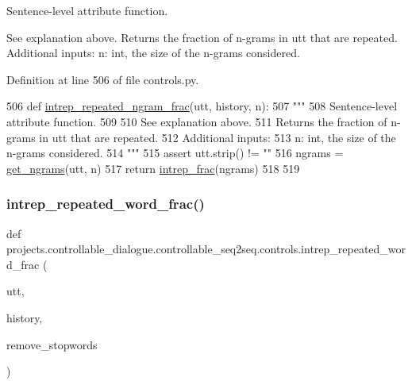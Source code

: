 \begin{DoxyVerb}Sentence-level attribute function.

See explanation above.
Returns the fraction of n-grams in utt that are repeated.
Additional inputs:
  n: int, the size of the n-grams considered.
\end{DoxyVerb}
 

Definition at line 506 of file controls.\+py.


\begin{DoxyCode}
506 \textcolor{keyword}{def }\hyperlink{namespaceprojects_1_1controllable__dialogue_1_1controllable__seq2seq_1_1controls_afeb51a7c1798dbff5427d5ddec3d735c}{intrep\_repeated\_ngram\_frac}(utt, history, n):
507     \textcolor{stringliteral}{"""}
508 \textcolor{stringliteral}{    Sentence-level attribute function.}
509 \textcolor{stringliteral}{}
510 \textcolor{stringliteral}{    See explanation above.}
511 \textcolor{stringliteral}{    Returns the fraction of n-grams in utt that are repeated.}
512 \textcolor{stringliteral}{    Additional inputs:}
513 \textcolor{stringliteral}{      n: int, the size of the n-grams considered.}
514 \textcolor{stringliteral}{    """}
515     \textcolor{keyword}{assert} utt.strip() != \textcolor{stringliteral}{""}
516     ngrams = \hyperlink{namespaceprojects_1_1controllable__dialogue_1_1controllable__seq2seq_1_1controls_abf6d099074de6b0c663333470eeaa2de}{get\_ngrams}(utt, n)
517     \textcolor{keywordflow}{return} \hyperlink{namespaceprojects_1_1controllable__dialogue_1_1controllable__seq2seq_1_1controls_a6774bd6ac8941123de4574e69686140a}{intrep\_frac}(ngrams)
518 
519 
\end{DoxyCode}
\mbox{\label{namespaceprojects_1_1controllable__dialogue_1_1controllable__seq2seq_1_1controls_a6cac190e0676d3938ec8c2e5bd0c994d}} 
\subsubsection{\texorpdfstring{intrep\+\_\+repeated\+\_\+word\+\_\+frac()}{intrep\_repeated\_word\_frac()}}
{\footnotesize\ttfamily def projects.\+controllable\+\_\+dialogue.\+controllable\+\_\+seq2seq.\+controls.\+intrep\+\_\+repeated\+\_\+word\+\_\+frac (\begin{DoxyParamCaption}\item[{}]{utt,  }\item[{}]{history,  }\item[{}]{remove\+\_\+stopwords }\end{DoxyParamCaption})}

